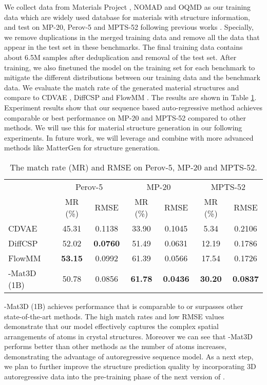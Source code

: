 We collect data from Materials Project \cite{materialsproject}, NOMAD \cite{nomad} and OQMD \cite{oqmd2013,oqmd2015} as our training data which are widely used database for materials with structure information, and test on MP-20, Perov-5 and MPTS-52 following previous works \cite{cdvae,diffcsp,flowmm}. Specially, we remove duplications in the merged training data and remove all the data that appear in the test set in these benchmarks. The final training data contains about 6.5M samples after deduplication and removal of the test set. After training, we also finetuned the model on the training set for each benchmark to mitigate the different distributions between our training data and the benchmark data. We evaluate the match rate of the generated material structures and compare to CDVAE \cite{cdvae}, DiffCSP \cite{diffcsp} and FlowMM \cite{flowmm}. The results are shown in Table \ref{tab:mat_struct_pred}. Experiment results show that our sequence based auto-regressive method achieves comparable or best
performance on MP-20 and MPTS-52 compared to other methods. We will use this for material structure generation in our following experiments. In future work, we will leverage and combine with more advanced methods like MatterGen \cite{zeni2023mattergen} for structure generation.

\begin{table}[!htbp]
\centering
\begin{tabular}{lcccccc}
        \hline
         & \multicolumn{2}{c}{Perov-5} & \multicolumn{2}{c}{MP-20} & \multicolumn{2}{c}{MPTS-52} \\
        & MR (\%)  & RMSE & MR (\%) & RMSE & MR (\%) & RMSE\\
        \hline
        CDVAE  & 45.31 & 0.1138 & 33.90 & 0.1045 & 5.34 & 0.2106 \\
        DiffCSP & 52.02 & \textbf{0.0760} & 51.49 & 0.0631 & 12.19 & 0.1786 \\
        FlowMM & \textbf{53.15} & 0.0992 & 61.39 & 0.0566 & 17.54 & 0.1726 \\
        \ourM{}-Mat3D (1B) & 50.78 & 0.0856 & \textbf{61.78} & \textbf{0.0436} & \textbf{30.20} & \textbf{0.0837} \\
        \hline
    \end{tabular}
    \caption{The match rate (MR) and RMSE on Perov-5, MP-20 and MPTS-52.}
    \label{tab:mat_struct_pred}
\end{table}

\ourM{}-Mat3D (1B) achieves performance that is comparable to or surpasses other state-of-the-art methods. The high match rates and low RMSE values demonstrate that our model effectively captures the complex spatial arrangements of atoms in crystal structures. Moreover we can see that \ourM{}-Mat3D performs better than other methods as the number of atoms increases, demonstrating the advantage of autoregressive sequence model. As a next step, we plan to further improve the structure prediction quality by incorporating 3D autoregressive data into the pre-training phase of the next version of \ourM{}.
